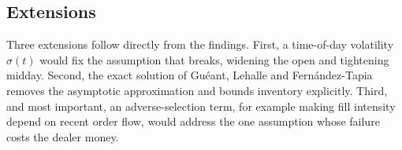 \subsection{Extensions}

Three extensions follow directly from the findings. First, a time-of-day volatility $\sigma(t)$ would
fix the assumption that breaks, widening the open and tightening midday. Second, the exact solution
of Gu\'eant, Lehalle and Fern\'andez-Tapia~\cite{gueant2013} removes the asymptotic approximation and
bounds inventory explicitly. Third, and most important, an adverse-selection term, for example making
fill intensity depend on recent order flow, would address the one assumption whose failure costs the
dealer money.
